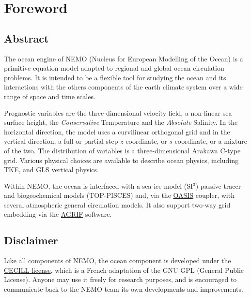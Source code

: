 \documentclass[../main/NEMO_manual]{subfiles}
\begin{document}
\chapter*{Foreword}

\section*{Abstract}

The ocean engine of NEMO (Nucleus for European Modelling of the Ocean) is a primitive equation model adapted to
regional and global ocean circulation problems.
It is intended to be a flexible tool for studying the ocean and its interactions with the others components of
the earth climate system over a wide range of space and time scales.

Prognostic variables are the three-dimensional velocity field, a non-linear sea surface height,
the \textit{Conservative} Temperature and the \textit{Absolute} Salinity.
In the horizontal direction, the model uses a curvilinear orthogonal grid and in the vertical direction,
a full or partial step $z$-coordinate, or $s$-coordinate, or a mixture of the two.
The distribution of variables is a three-dimensional Arakawa C-type grid.
Various physical choices are available to describe ocean physics, including TKE, and GLS vertical physics.

Within NEMO, the ocean is interfaced with a sea-ice model (SI$^3$)
passive tracer and biogeochemical models (TOP-PISCES) and,
via the \href{https://portal.enes.org/oasis}{OASIS} coupler, with several atmospheric general circulation models.
It also support two-way grid embedding via the \href{http://agrif.imag.fr}{AGRIF} software.


\section*{Disclaimer}

Like all components of NEMO, the ocean component is developed under
the \href{http://www.cecill.info}{CECILL license}, which is a French adaptation of the GNU GPL
(General Public License).
Anyone may use it freely for research purposes, and is encouraged to communicate back to the NEMO team
its own developments and improvements.
\end{document}

